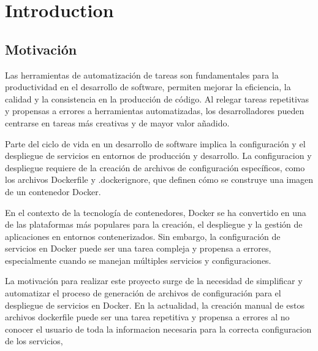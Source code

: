 \documentclass[12pt, a4paper, twoside]{article}
\begin{document}

\newpage




\newpage


\newpage

\tableofcontents
\newpage








\section{Introduction}

\subsection{Motivación}
Las herramientas de automatización de tareas son fundamentales para la productividad en el desarrollo de software, permiten mejorar la eficiencia, la calidad y la consistencia en la producción de código.
Al relegar tareas repetitivas y propensas a errores a herramientas automatizadas, los desarrolladores pueden centrarse en tareas más creativas y de mayor valor añadido.

Parte del ciclo de vida en un desarrollo de software implica la configuración y el despliegue de servicios en entornos de producción y desarrollo.
La configuracion y despliegue requiere de la creación de archivos de configuración específicos, como los archivos Dockerfile y .dockerignore, que definen cómo se construye una imagen de un contenedor Docker.

En el contexto de la tecnología de contenedores, Docker se ha convertido en una de las plataformas más populares para la creación, el despliegue y la gestión de aplicaciones en entornos contenerizados. 
Sin embargo, la configuración de servicios en Docker puede ser una tarea compleja y propensa a errores, especialmente cuando se manejan múltiples servicios y configuraciones.

La motivación para realizar este proyecto surge de la necesidad de simplificar y automatizar el proceso de generación de archivos de configuración para el despliegue de servicios en Docker. 
En la actualidad, la creación manual de estos archivos dockerfile puede ser una tarea repetitiva y propensa a errores al no conocer el usuario de toda la informacion necesaria para la correcta configuracion de los servicios, 
\end{document}
